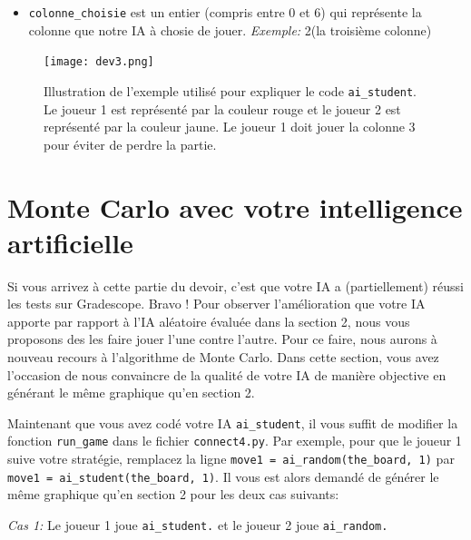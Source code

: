 \documentclass[11pt,answers]{exam}
\begin{document}
\begin{itemize}
	\item \texttt{colonne\_choisie} est un entier (compris entre 0 et 6) qui représente la colonne que notre IA à chosie de jouer. \emph{Exemple:} 2(la troisième colonne)
\end{itemize}

\bigskip

\begin{figure}[!h]
	\centering
	\texttt{[image: dev3.png]}
	\caption{Illustration de l'exemple utilisé pour expliquer le code \texttt{ai\_student}. Le joueur 1 est représenté par la couleur rouge et le joueur 2 est représenté par la couleur jaune. Le joueur 1 doit jouer la colonne 3 pour éviter de perdre la partie.}
	\label{fig:ex_sec3}
\end{figure}

\newpage

\section{Monte Carlo avec votre intelligence artificielle}

Si vous arrivez à cette partie du devoir, c'est que votre IA a (partiellement) réussi les tests sur Gradescope. Bravo ! Pour observer l'amélioration que votre IA apporte par rapport à l'IA aléatoire évaluée dans la section 2, nous vous proposons des les faire jouer l'une contre l'autre. Pour ce faire, nous aurons à nouveau recours à l'algorithme de Monte Carlo. Dans cette section, vous avez l'occasion de nous convaincre de la qualité de votre IA de manière objective en générant le même graphique qu'en section 2.

\bigskip

Maintenant que vous avez codé votre IA \texttt{ai\_student}, il vous suffit de modifier la fonction \texttt{run\_game} dans le fichier \texttt{connect4.py}. Par exemple, pour que le joueur 1 suive votre stratégie, remplacez la ligne \texttt{move1 = ai\_random(the\_board, 1)} par \texttt{move1 = ai\_student(the\_board, 1)}. Il vous est alors demandé de générer le même graphique qu'en section 2 pour les deux cas suivants:

\newpage

\emph{Cas 1:} Le joueur 1 joue \texttt{ai\_student.} et le joueur 2 joue \texttt{ai\_random.}
\end{document}
